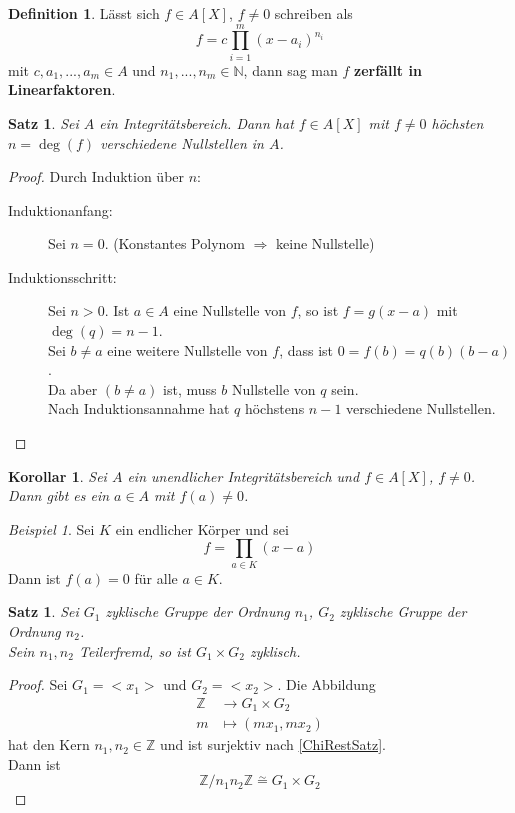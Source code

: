 \documentclass[10pt,a4paper]{article}
\newcommand{\N}{\ensuremath{\mathbb{N}}}
\newcommand{\Z}{\ensuremath{\mathbb{Z}}}
\newcommand{\isom}{\overset{\sim}{=}}
\theoremstyle{plain}
\newtheorem{kor}[theorem]{Korollar}
\newtheorem{satz}[theorem]{Satz}
\theoremstyle{definition}
\newtheorem{definition}[theorem]{Definition}
\theoremstyle{remark}
\newtheorem{exm}[theorem]{Beispiel}
\begin{document}
	\begin{definition}
		Lässt sich $f\in A[X]$, $f\neq 0$ schreiben als
		\[f=c\prod_{i=1}^{m}(x-a_i)^{n_i}\]
		mit $c,a_1,...,a_m\in A$ und $n_1,...,n_m\in\N$, dann sag man $f$ \textbf{zerfällt in Linearfaktoren}.
	\end{definition}

	\begin{satz}
		Sei $A$ ein Integritätsbereich. Dann hat $f\in A[X]$ mit $f\neq 0$ höchsten $n=\deg(f)$ verschiedene Nullstellen in $A$.
	\end{satz}
	\begin{proof}
		Durch Induktion über $n$:
		\begin{description}
			\item[Induktionanfang:] Sei $n=0$. (Konstantes Polynom $\Rightarrow$ keine Nullstelle)
			\item[Induktionsschritt:] Sei $n>0$. Ist $a\in A$ eine Nullstelle von $f$, so ist $f=g(x-a)$ mit $\deg(q)=n-1$.\\
			Sei $b\neq a$ eine weitere Nullstelle von $f$, dass ist $0=f(b)=q(b)(b-a)$.\\
			Da aber $(b\neq a)$ ist, muss $b$ Nullstelle von $q$ sein.\\
			Nach Induktionsannahme hat $q$ höchstens $n-1$ verschiedene Nullstellen.
		\end{description}
	\end{proof}

	\begin{kor}
		Sei $A$ ein unendlicher Integritätsbereich und $f\in A[X]$, $f\neq0$. Dann gibt es ein $a\in A$ mit $f(a)\neq 0$.
	\end{kor}

	\begin{exm}
		Sei $K$ ein endlicher Körper und sei
		\[f=\prod_{a\in K}(x-a)\]
		Dann ist $f(a)=0$ für alle $a\in K$.
	\end{exm}

	\begin{satz}
		Sei $G_1$ zyklische Gruppe der Ordnung $n_1$, $G_2$ zyklische Gruppe der Ordnung $n_2$.\\
		Sein $n_1,n_2$ Teilerfremd, so ist $G_1\times G_2$ zyklisch.
	\end{satz}

	\begin{proof}
		Sei $G_1=<x_1>$ und $G_2=<x_2>$. Die Abbildung
		\begin{align*}
		\Z&\to G_1\times G_2\\
		m&\mapsto (mx_1,mx_2)
		\end{align*}
		hat den Kern $n_1,n_2\in\Z$ und ist surjektiv nach \ref{ChiRestSatz}.\\
		Dann ist
		\[\Z/n_1n_2\Z\isom G_1\times G_2\] 
	\end{proof}
\end{document}
